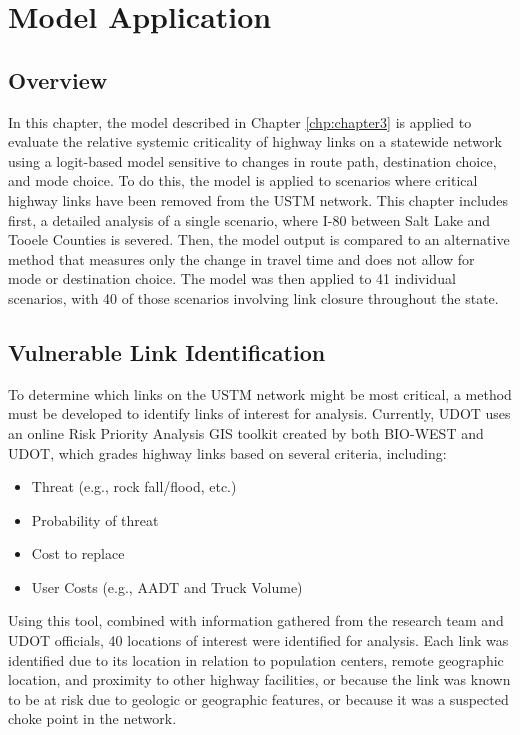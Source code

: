 \chapter{Model Application}
\label{chp:chapter4}
\graphicspath{{figures/}{figures/chapter4/}}

\section{Overview}
In this chapter, the model described in Chapter \ref{chp:chapter3} is applied to evaluate the relative systemic
criticality of highway links on a statewide network using a logit-based model
sensitive to changes in route path, destination choice, and mode choice. To do this, the model is applied to scenarios
where critical highway links have been removed from the USTM network. This
chapter includes first, a detailed analysis of a single scenario, where I-80
between Salt Lake and Tooele Counties is severed. Then, the model
output is compared to an alternative method that measures only the change in travel
time and does not allow for mode or destination choice. The model was then
applied to 41 individual scenarios, with 40 of those scenarios involving link
closure throughout the state.

\section{Vulnerable Link Identification}
To determine which links on the USTM network might be most critical,
a method must be developed to identify links of interest for analysis. Currently, UDOT uses
an online Risk Priority Analysis GIS toolkit created by both BIO-WEST and UDOT,
which grades highway links based on several criteria, including:
\begin{itemize}
   \item {Threat (e.g., rock fall/flood, etc.)}
   \item {Probability of threat}
   \item {Cost to replace}
   \item {User Costs (e.g., AADT and Truck Volume)}
\end{itemize}
Using this tool, combined with information gathered from the research team and UDOT
officials, 40 locations of interest were identified for analysis. Each link was
identified due to its location in relation to
population centers, remote geographic location, and proximity to other highway
facilities, or because the link was known to be at risk due to geologic or geographic features, or
because it was a suspected choke point in the network.

